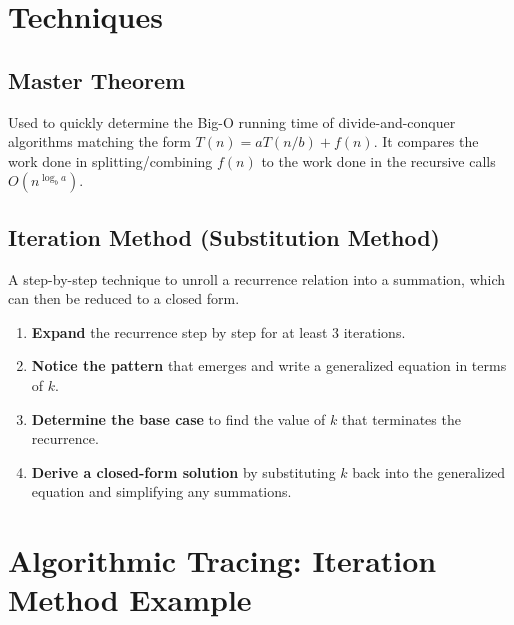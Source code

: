 \section{Techniques}

\subsection{Master Theorem}
\begin{theorem}
Used to quickly determine the Big-O running time of divide-and-conquer algorithms matching the form $T(n) = aT(n/b) + f(n)$. It compares the work done in splitting/combining $f(n)$ to the work done in the recursive calls $O(n^{\log_b a})$.
\end{theorem}

\subsection{Iteration Method (Substitution Method)}
A step-by-step technique to unroll a recurrence relation into a summation, which can then be reduced to a closed form.
\begin{enumerate}
    \item \textbf{Expand} the recurrence step by step for at least 3 iterations.
    \item \textbf{Notice the pattern} that emerges and write a generalized equation in terms of $k$.
    \item \textbf{Determine the base case} to find the value of $k$ that terminates the recurrence.
    \item \textbf{Derive a closed-form solution} by substituting $k$ back into the generalized equation and simplifying any summations.
\end{enumerate}

\section{Algorithmic Tracing: Iteration Method Example}

